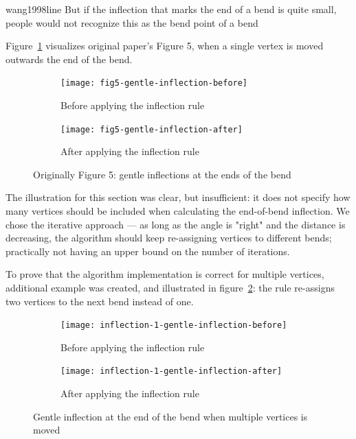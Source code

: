 \documentclass[a4paper]{article}
\begin{document}
\begin{displaycquote}{wang1998line}
    But if the inflection that marks the end of a bend is quite small, people
    would not recognize this as the bend point of a bend
\end{displaycquote}

Figure~\ref{fig:fig5-gentle-inflection} visualizes original paper's Figure 5,
when a single vertex is moved outwards the end of the bend.

\begin{figure}[h]
    \centering
    \begin{subfigure}[b]{.49\textwidth}
        \texttt{[image: fig5-gentle-inflection-before]}
        \caption{Before applying the inflection rule}
    \end{subfigure}
    \hfill
    \begin{subfigure}[b]{.49\textwidth}
        \texttt{[image: fig5-gentle-inflection-after]}
        \caption{After applying the inflection rule}
    \end{subfigure}
    \caption{Originally Figure 5: gentle inflections at the ends of the bend}
    \label{fig:fig5-gentle-inflection}
\end{figure}

The illustration for this section was clear, but insufficient: it does not
specify how many vertices should be included when calculating the end-of-bend
inflection. We chose the iterative approach --- as long as the angle is "right"
and the distance is decreasing, the algorithm should keep re-assigning vertices
to different bends; practically not having an upper bound on the number of
iterations.

To prove that the algorithm implementation is correct for multiple vertices,
additional example was created, and illustrated in
figure~\ref{fig:inflection-1-gentle-inflection}: the rule re-assigns two
vertices to the next bend instead of one.

\begin{figure}[h]
    \centering
    \begin{subfigure}[b]{.49\textwidth}
        \texttt{[image: inflection-1-gentle-inflection-before]}
        \caption{Before applying the inflection rule}
    \end{subfigure}
    \hfill
    \begin{subfigure}[b]{.49\textwidth}
        \texttt{[image: inflection-1-gentle-inflection-after]}
        \caption{After applying the inflection rule}
    \end{subfigure}
    \caption{Gentle inflection at the end of the bend when multiple vertices is moved}
    \label{fig:inflection-1-gentle-inflection}
\end{figure}
\end{document}
